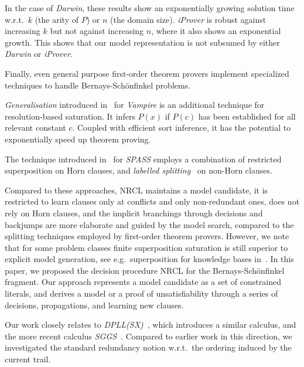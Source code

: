 \documentclass[a4paper]{article}
\newcommand{\mEPR}{Bernays-Sch\"onfinkel}
\newcommand{\eg}{e.g.\ }
\newcommand{\wrt}{w.r.t.\ }
\begin{document}
In the case of \emph{Darwin}, these results show an exponentially 
growing solution time \wrt $k$ (the arity of $P$) or  $n$ (the domain size). 
\emph{iProver} is robust against increasing $k$ but not against increasing
$n$, where it also shows an exponential growth. 
 This shows that our model representation is not subsumed by either \emph{Darwin} or \emph{iProver}.


Finally, even general purpose first-order theorem provers implement specialized techniques to handle {\mEPR} problems.

\emph{Generalisation} introduced in~\cite{Generalization08} for \emph{Vampire} 
is an additional technique for resolution-based saturation. 
It infers $P(x)$ if $P(c)$ has been established for all relevant constant $c$.
Coupled with efficient sort inference, it has the potential to exponentially speed up theorem proving.

The technique introduced in~\cite{HillenbrandWeidenbach13} for \emph{SPASS} employs 
a combination of restricted superposition on Horn clauses, and \emph{labelled splitting}~\cite{FietzkeW09} on non-Horn clauses.

Compared to these approaches, NRCL maintains a model candidate, it is restricted to learn clauses only at conflicts and only non-redundant ones, 
does not rely on Horn clauses, and the implicit branchings through decisions and backjumps are more elaborate and guided by the model search,
compared to the splitting techniques employed by first-order theorem provers.
However, we note that for some problem classes finite superposition saturation is still
superior to explicit model generation, see \eg superposition for knowledge bases in~\cite{SudaWeidenbachWischnewskiIJCAR10}.
In this paper, we proposed the decision procedure NRCL for the {\mEPR}
fragment. 
Our approach represents a model candidate as a set of constrained literals, and 
derives a model or a proof of unsatisfiability through a series of decisions, 
propagations, and learning new clauses. 

Our work closely relates to \emph{DPLL(SX)}~\cite{DPLLSX10}, which introduces a similar calculus,
and the more recent calculus \emph{SGGS}~\cite{SGGSExposition}.
Compared to earlier work in this direction, we investigated the standard redundancy notion
w.r.t.\ the ordering induced by the current trail.
\end{document}
